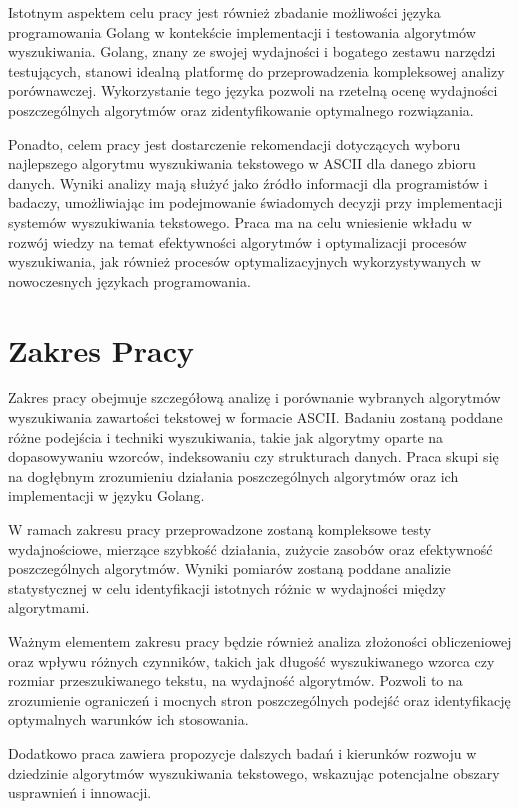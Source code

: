 Istotnym aspektem celu pracy jest również zbadanie możliwości języka programowania Golang
w kontekście implementacji i testowania algorytmów wyszukiwania.
Golang, znany ze swojej wydajności i bogatego zestawu narzędzi testujących,
stanowi idealną platformę do przeprowadzenia kompleksowej analizy porównawczej.
Wykorzystanie tego języka pozwoli na rzetelną ocenę wydajności poszczególnych 
algorytmów oraz zidentyfikowanie optymalnego rozwiązania.

Ponadto, celem pracy jest dostarczenie rekomendacji dotyczących wyboru najlepszego algorytmu wyszukiwania
tekstowego w ASCII dla danego zbioru danych. Wyniki analizy mają służyć jako źródło informacji dla 
programistów i badaczy, umożliwiając im podejmowanie świadomych decyzji przy 
implementacji systemów wyszukiwania tekstowego. Praca ma na celu wniesienie 
wkładu w rozwój wiedzy na temat efektywności algorytmów i optymalizacji procesów wyszukiwania, 
jak również procesów optymalizacyjnych wykorzystywanych w nowoczesnych językach programowania. 

\section{Zakres Pracy}
Zakres pracy obejmuje szczegółową analizę i porównanie wybranych algorytmów wyszukiwania zawartości tekstowej w formacie ASCII.
Badaniu zostaną poddane różne podejścia i techniki wyszukiwania, takie jak algorytmy oparte na dopasowywaniu wzorców,
indeksowaniu czy strukturach danych. Praca skupi się na dogłębnym zrozumieniu
działania poszczególnych algorytmów oraz ich implementacji w języku Golang.

W ramach zakresu pracy przeprowadzone zostaną kompleksowe testy wydajnościowe, mierzące szybkość działania,
zużycie zasobów oraz efektywność poszczególnych algorytmów. Wyniki pomiarów zostaną poddane analizie statystycznej
w celu identyfikacji istotnych różnic w wydajności między algorytmami.

Ważnym elementem zakresu pracy będzie również analiza złożoności obliczeniowej 
oraz wpływu różnych czynników, takich jak długość wyszukiwanego wzorca czy rozmiar
przeszukiwanego tekstu, na wydajność algorytmów. Pozwoli to na zrozumienie ograniczeń
i mocnych stron poszczególnych podejść oraz identyfikację optymalnych warunków ich stosowania.

Dodatkowo praca zawiera propozycje dalszych badań i kierunków rozwoju w dziedzinie algorytmów wyszukiwania
tekstowego, wskazując potencjalne obszary usprawnień i innowacji.


